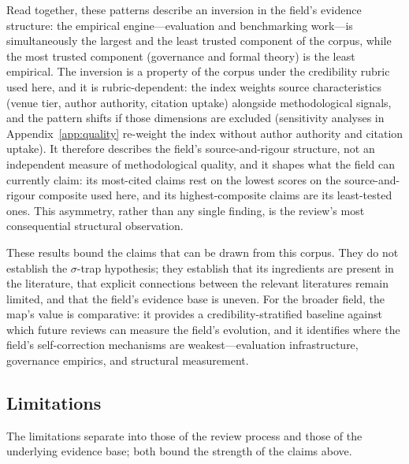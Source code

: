 Read together, these patterns describe an inversion in the field's evidence structure: the empirical engine---evaluation and benchmarking work---is simultaneously the largest and the least trusted component of the corpus, while the most trusted component (governance and formal theory) is the least empirical. The inversion is a property of the corpus under the credibility rubric used here, and it is rubric-dependent: the index weights source characteristics (venue tier, author authority, citation uptake) alongside methodological signals, and the pattern shifts if those dimensions are excluded (sensitivity analyses in Appendix~\ref{app:quality} re-weight the index without author authority and citation uptake). It therefore describes the field's source-and-rigour structure, not an independent measure of methodological quality, and it shapes what the field can currently claim: its most-cited claims rest on the lowest scores on the source-and-rigour composite used here, and its highest-composite claims are its least-tested ones. This asymmetry, rather than any single finding, is the review's most consequential structural observation.

These results bound the claims that can be drawn from this corpus. They do not establish the $\sigma$-trap hypothesis; they establish that its ingredients are present in the literature, that explicit connections between the relevant literatures remain limited, and that the field's evidence base is uneven. For the broader field, the map's value is comparative: it provides a credibility-stratified baseline against which future reviews can measure the field's evolution, and it identifies where the field's self-correction mechanisms are weakest---evaluation infrastructure, governance empirics, and structural measurement.

\subsection{Limitations}
The limitations separate into those of the review process and those of the underlying evidence base; both bound the strength of the claims above.

